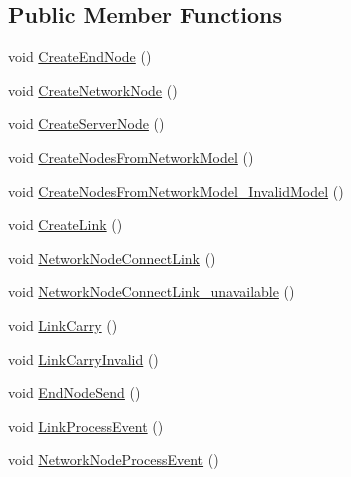 \subsection*{Public Member Functions}
\begin{DoxyCompactItemize}
\item 
void \hyperlink{classNetTrafficSimulator_1_1SimulationControllerTest_a2813d40f709bc9378df7d81f03959469}{Create\-End\-Node} ()
\item 
void \hyperlink{classNetTrafficSimulator_1_1SimulationControllerTest_a60f6c7ae0fa98102a8489175b5960dda}{Create\-Network\-Node} ()
\item 
void \hyperlink{classNetTrafficSimulator_1_1SimulationControllerTest_aab0055f8c4f17343d5b2099d33ff737c}{Create\-Server\-Node} ()
\item 
void \hyperlink{classNetTrafficSimulator_1_1SimulationControllerTest_a9e369eaeaa2e00fa31397fc8deef9546}{Create\-Nodes\-From\-Network\-Model} ()
\item 
void \hyperlink{classNetTrafficSimulator_1_1SimulationControllerTest_a2f63b4bad7b887be6d12469de963ce4c}{Create\-Nodes\-From\-Network\-Model\-\_\-\-Invalid\-Model} ()
\item 
void \hyperlink{classNetTrafficSimulator_1_1SimulationControllerTest_a24442ce1820259c99dc2a92aa4d31756}{Create\-Link} ()
\item 
void \hyperlink{classNetTrafficSimulator_1_1SimulationControllerTest_a2868c0a13ec4b7b017ce71e3822b16a5}{Network\-Node\-Connect\-Link} ()
\item 
void \hyperlink{classNetTrafficSimulator_1_1SimulationControllerTest_abb9c12c2b206efeb4a7ec69b30ad9230}{Network\-Node\-Connect\-Link\-\_\-unavailable} ()
\item 
void \hyperlink{classNetTrafficSimulator_1_1SimulationControllerTest_aebd9c6da0d354dd19f798726a6b47f76}{Link\-Carry} ()
\item 
void \hyperlink{classNetTrafficSimulator_1_1SimulationControllerTest_ad1b5e3b09d5ef7773c5f4f486c18faff}{Link\-Carry\-Invalid} ()
\item 
void \hyperlink{classNetTrafficSimulator_1_1SimulationControllerTest_ab1d43222ede1faef36cf44f936eb120f}{End\-Node\-Send} ()
\item 
void \hyperlink{classNetTrafficSimulator_1_1SimulationControllerTest_a650b4d519575abe3f2a6528a886b75e9}{Link\-Process\-Event} ()
\item 
void \hyperlink{classNetTrafficSimulator_1_1SimulationControllerTest_a23cb3dafea04be3798f19d3ad28f2718}{Network\-Node\-Process\-Event} ()

\end{DoxyCompactItemize}
